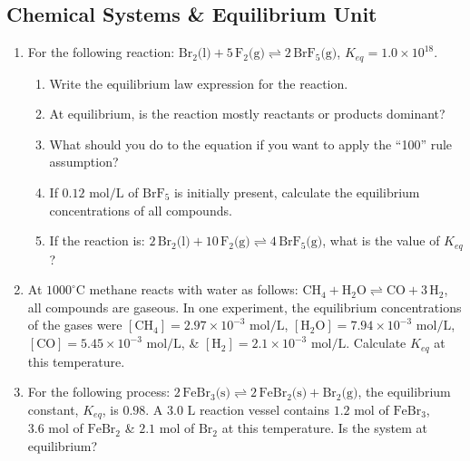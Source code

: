 \documentclass[12pt]{article}
\begin{document}
\newpage

\subsection*{Chemical Systems \& Equilibrium Unit}

\begin{enumerate}[label=\arabic*.]
    \item For the following reaction: $\text{Br}_2\text{(l)} + 5\,\text{F}_2\text{(g)} \rightleftharpoons 2\,\text{BrF}_5\text{(g)}$, $K_{eq} = 1.0 \times 10^{18}$.
    \begin{enumerate}[label=\alph*)]
        \item Write the equilibrium law expression for the reaction.
        \vspace{1.5cm}
        \item At equilibrium, is the reaction mostly reactants or products dominant?
        \vspace{1.5cm}
        \item What should you do to the equation if you want to apply the ``100'' rule assumption?
        \vspace{1.5cm}
        \item If $0.12\text{ mol/L}$ of $\text{BrF}_5$ is initially present, calculate the equilibrium concentrations of all compounds.
        \vspace{3.5cm}
        \item If the reaction is: $2\,\text{Br}_2\text{(l)} + 10\,\text{F}_2\text{(g)} \rightleftharpoons 4\,\text{BrF}_5\text{(g)}$, what is the value of $K_{eq}$?
        \vspace{2cm}
    \end{enumerate}

    \item At $1000^\circ\text{C}$ methane reacts with water as follows: $\text{CH}_4 + \text{H}_2\text{O} \rightleftharpoons \text{CO} + 3\,\text{H}_2$, all compounds are gaseous. In one experiment, the equilibrium concentrations of the gases were $[\text{CH}_4] = 2.97 \times 10^{-3}\text{ mol/L}$, $[\text{H}_2\text{O}] = 7.94 \times 10^{-3}\text{ mol/L}$, $[\text{CO}] = 5.45 \times 10^{-3}\text{ mol/L}$, \& $[\text{H}_2] = 2.1 \times 10^{-3}\text{ mol/L}$. Calculate $K_{eq}$ at this temperature.
    \vspace{3.5cm}

    \item For the following process: $2\,\text{FeBr}_3\text{(s)} \rightleftharpoons 2\,\text{FeBr}_2\text{(s)} + \text{Br}_2\text{(g)}$, the equilibrium constant, $K_{eq}$, is $0.98$. A $3.0\text{ L}$ reaction vessel contains $1.2\text{ mol}$ of $\text{FeBr}_3$, $3.6\text{ mol}$ of $\text{FeBr}_2$ \& $2.1\text{ mol}$ of $\text{Br}_2$ at this temperature. Is the system at equilibrium?
    \vspace{3.5cm}


\end{enumerate}
\end{document}

